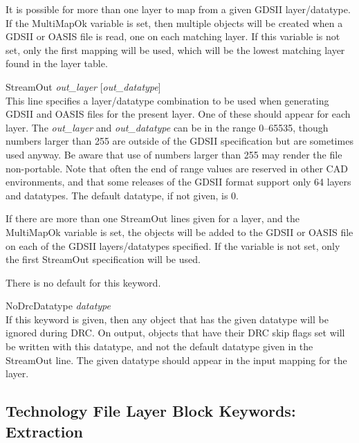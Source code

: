 \begin{description}
It is possible for more than one {\Xic} layer to map from a given
GDSII layer/datatype.  If the {\et MultiMapOk} variable is set, then
multiple objects will be created when a GDSII or OASIS file is read,
one on each matching {\Xic} layer.  If this variable is not set, only
the first mapping will be used, which will be the lowest matching
layer found in the layer table.

\item{\et StreamOut {\it out\_layer\/} [{\it out\_datatype\/}]}\\
This line specifies a layer/datatype combination to be used when
generating GDSII and OASIS files for the present {\Xic} layer.  One of
these should appear for each {\Xic} layer.  The {\it out\_layer} and
{\it out\_datatype} can be in the range 0--65535, though numbers
larger than 255 are outside of the GDSII specification but are
sometimes used anyway.  Be aware that use of numbers larger than 255
may render the file non-portable.  Note that often the end of range
values are reserved in other CAD environments, and that some releases
of the GDSII format support only 64 layers and datatypes.  The default
datatype, if not given, is 0.

If there are more than one {\et StreamOut} lines given for a layer,
and the {\et MultiMapOk} variable is set, the objects will be added to
the GDSII or OASIS file on each of the GDSII layers/datatypes
specified.  If the variable is not set, only the first {\et StreamOut}
specification will be used.

There is no default for this keyword.

\item{\et NoDrcDatatype} {\it datatype}\\
If this keyword is given, then any object that has the given datatype
will be ignored during DRC.  On output, objects that have their DRC
skip flags set will be written with this datatype, and not the default
datatype given in the {\et StreamOut} line.  The given datatype should
appear in the input mapping for the layer.
\end{description}


\subsection{Technology File Layer Block Keywords:  Extraction}
\label{exkwords}


